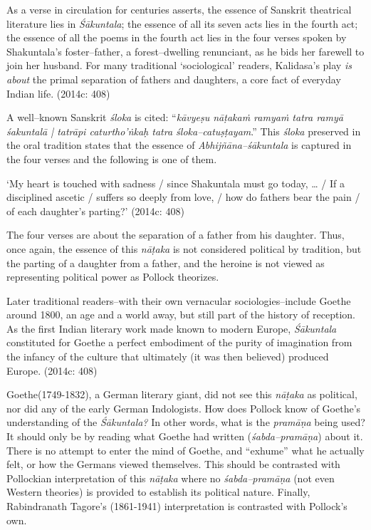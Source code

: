 \begin{myquote}
As a verse in circulation for centuries asserts, the essence of Sanskrit theatrical literature lies in \textit{Śākuntala}; the essence of all its seven acts lies in the fourth act; the essence of all the poems in the fourth act lies in the four verses spoken by Shakuntala’s foster–father, a forest–dwelling renunciant, as he bids her farewell to join her husband. For many traditional ‘sociological’ readers, Kalidasa’s play \textit{is about} the primal separation of fathers and daughters, a core fact of everyday Indian life. (2014c: 408)
\end{myquote}

A well–known Sanskrit \textit{śloka} is cited: “\textit{kāvyeṣu nāṭakaṁ ramyaṁ tatra ramyā śakuntalā | tatrāpi caturtho'ṅkaḥ tatra śloka–catuṣṭayam}.” This \textit{śloka} preserved in the oral tradition states that the essence of \textit{Abhijñāna–śākuntala }is captured in the four verses and the following is one of them.

\begin{myquote}
‘My heart is touched with sadness / since Shakuntala must go today, … / If a disciplined ascetic / suffers so deeply from love, / how do fathers bear the pain / of each daughter’s parting?’ (2014c: 408)
\end{myquote}

The four verses are about the separation of a father from his daughter. Thus, once again, the essence of this \textit{nāṭaka }is not considered political by tradition, but the parting of a daughter from a father, and the heroine is not viewed as representing political power as Pollock theorizes.

\begin{myquote}
Later traditional readers–with their own vernacular sociologies–include Goethe around 1800, an age and a world away, but still part of the history of reception. As the first Indian literary work made known to modern Europe, \textit{Śākuntala} constituted for Goethe a perfect embodiment of the purity of imagination from the infancy of the culture that ultimately (it was then believed) produced Europe. (2014c: 408)
\end{myquote}

Goethe(1749-1832), a German literary giant, did not see this \textit{nāṭaka }as political, nor did any of the early German Indologists. How does Pollock know of Goethe’s understanding of the \textit{Śākuntala?} In other words, what is the \textit{pramāṇa} being used? It should only be by reading what Goethe had written (\textit{śabda–pramāṇa}) about it. There is no attempt to enter the mind of Goethe, and “exhume” what he actually felt, or how the Germans viewed themselves. This should be contrasted with Pollockian interpretation of this \textit{nāṭaka} where no \textit{śabda–pramāṇa }(not even Western theories) is provided to establish its political nature. Finally, Rabindranath Tagore’s (1861-1941) interpretation is contrasted with Pollock’s own.

